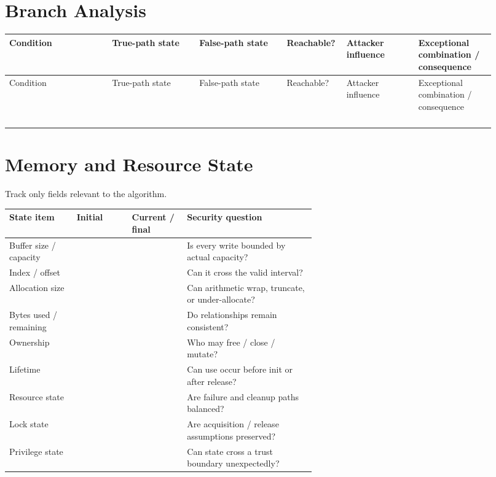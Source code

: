 \documentclass[10pt]{article}
\begin{document}
\section{Branch Analysis}
\small
\begin{longtable}{@{}L{0.20\linewidth}L{0.17\linewidth}L{0.17\linewidth}C{0.09\linewidth}L{0.14\linewidth}L{0.15\linewidth}@{}}
\toprule
Condition & True-path state & False-path state & Reachable? & Attacker influence & Exceptional combination / consequence \\
\midrule
\endfirsthead
\toprule
Condition & True-path state & False-path state & Reachable? & Attacker influence & Exceptional combination / consequence \\
\midrule
\endhead
\rule{0pt}{2.7em} & & & & & \\
\rule{0pt}{2.7em} & & & & & \\
\rule{0pt}{2.7em} & & & & & \\
\rule{0pt}{2.7em} & & & & & \\
\bottomrule
\end{longtable}
\normalsize
\clearpage

\section{Memory and Resource State}
Track only fields relevant to the algorithm.
\par\smallskip\noindent\begin{tabularx}{\linewidth}{@{}L{0.22\linewidth}L{0.18\linewidth}L{0.18\linewidth}Y@{}}
\toprule
State item & Initial & Current / final & Security question \\
\midrule
Buffer size / capacity & & & Is every write bounded by actual capacity? \\
Index / offset & & & Can it cross the valid interval? \\
Allocation size & & & Can arithmetic wrap, truncate, or under-allocate? \\
Bytes used / remaining & & & Do relationships remain consistent? \\
Ownership & & & Who may free / close / mutate? \\
Lifetime & & & Can use occur before init or after release? \\
Resource state & & & Are failure and cleanup paths balanced? \\
Lock state & & & Are acquisition / release assumptions preserved? \\
Privilege state & & & Can state cross a trust boundary unexpectedly? \\
\bottomrule
\end{tabularx}
\end{document}
